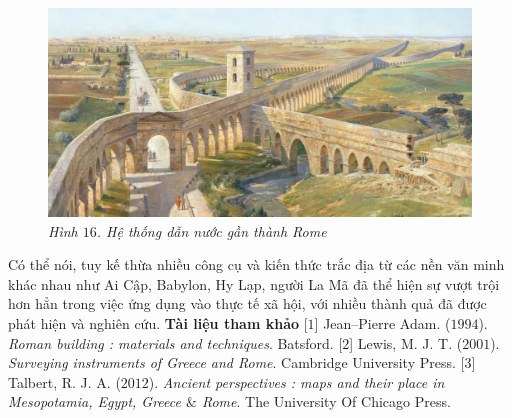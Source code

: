 \begin{multicols}{2}
	\begin{figure}[H]
		\vspace*{-5pt}
		\centering
		\captionsetup{labelformat= empty, justification=centering}
		\includegraphics[width= 1\linewidth]{16}
		\caption{\small\textit{\color{toanhocdoisong}Hình $16$. Hệ thống dẫn nước gần thành Rome}}
		\vspace*{-10pt}
	\end{figure}
	Có thể nói, tuy kế thừa nhiều công cụ và kiến thức trắc địa từ các nền văn minh khác nhau như Ai Cập, Babylon, Hy Lạp,  người La Mã đã thể hiện sự vượt trội hơn hẳn trong việc ứng dụng vào thực tế xã hội, với nhiều thành quả đã được phát hiện và nghiên cứu.
	\vskip 0.1cm
	\textbf{\color{toanhocdoisong}Tài liệu tham khảo}
	\vskip 0.1cm
	[$1$] Jean--Pierre Adam. ($1994$). \textit{Roman building : materials and techniques}. Batsford.
	\vskip 0.1cm
	[$2$] Lewis, M. J. T. ($2001$). \textit{Surveying instruments of Greece and Rome}. Cambridge University Press.
	\vskip 0.1cm
	[$3$] Talbert, R. J. A. ($2012$). \textit{Ancient perspectives : maps and their place in Mesopotamia, Egypt, Greece $\&$ Rome}. The University Of Chicago Press.
\end{multicols}